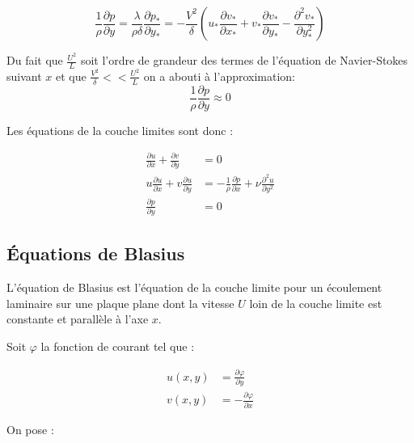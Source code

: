 \documentclass[french]{article}
\begin{document}
\begin{equation*}
	\frac{1}{\rho}
	\frac{\partial p}{\partial y} 
	= \frac{\lambda}{\rho\delta}
	\frac{\partial p_{*}}{\partial  y_{*}}
	= - \frac{V^{2}}{\delta}
	\left(
	u_{*}\frac{\partial v_{*}}{\partial x_{*}} + 
	v_{*}\frac{\partial v_{*}}{\partial y_{*}} 
	-\frac{\partial^{2} v_{*}}{\partial  y_{*}^{2}} 
	\right)
\end{equation*}

Du fait que $\frac{U^{2}}{L}$ soit l'ordre de grandeur des termes de l'équation de Navier-Stokes suivant $x$ et que $\frac{V^{2}}{\delta} << \frac{U^2}{L}$ on a abouti à l'approximation:
\begin{equation*}
	\frac{1}{\rho}\frac{\partial p}{\partial y} \approx 0
\end{equation*}

Les équations de la couche limites sont donc :

\begin{align}	
	\frac{\partial u}{\partial x} 
	+
	\frac{\partial v}{\partial y} 
	&= 0 \\
	u\frac{\partial u}{\partial x} + 
	v\frac{\partial u}{\partial y} 
	&= - \frac{1}{\rho}
	\frac{\partial p}{\partial  x} +
	\nu
	\frac{\partial^{2} u}{\partial  y^{2}} \\
	\frac{\partial p}{\partial y} 
	&= 0
\end{align}
\subsection{Équations de Blasius}
L'équation de Blasius est l'équation de la couche limite pour un écoulement laminaire sur une plaque plane dont la vitesse $U$ loin de la couche limite est constante et parallèle à l'axe $x$.

Soit $\varphi$ la fonction de courant tel que :

\begin{align*}
	u(x,y) &= 
	\frac{\partial \varphi}{\partial y} \\
	v(x,y) &= - 
	\frac{\partial \varphi}{\partial x}
\end{align*}

On pose :
\end{document}
